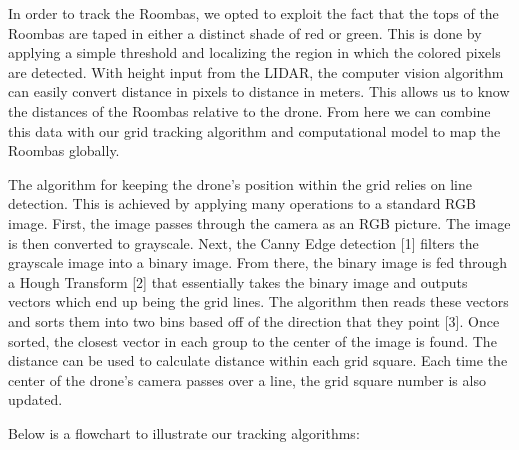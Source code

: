 \documentclass[12pt]{article}
\begin{document}
In order to track the Roombas, we opted to exploit the fact that the tops of the Roombas are taped in either a distinct shade of red or green. This is done by applying a simple threshold and localizing the region in which the colored pixels are detected. With height input from the LIDAR, the computer vision algorithm can easily convert distance in pixels to distance in meters. This allows us to know the distances of the Roombas relative to the drone. From here we can combine this data with our grid tracking algorithm and computational model to map the Roombas globally.

The algorithm for keeping the drone’s position within the grid relies on line detection. This is achieved by applying many operations to a standard RGB image. First, the image passes through the camera as an RGB picture. The image is then converted to grayscale. Next, the Canny Edge detection [1] filters the grayscale image into a binary image. From there, the binary image is fed through a Hough Transform [2] that essentially takes the binary image and outputs vectors which end up being the grid lines. The algorithm then reads these vectors and sorts them into two bins based off of the direction that they point [3]. Once sorted, the closest vector in each group to the center of the image is found. The distance can be used to calculate distance within each grid square. Each time the center of the drone’s camera passes over a line, the grid square number is also updated.

Below is a flowchart to illustrate our tracking algorithms: \\ \\ 
\end{document}
